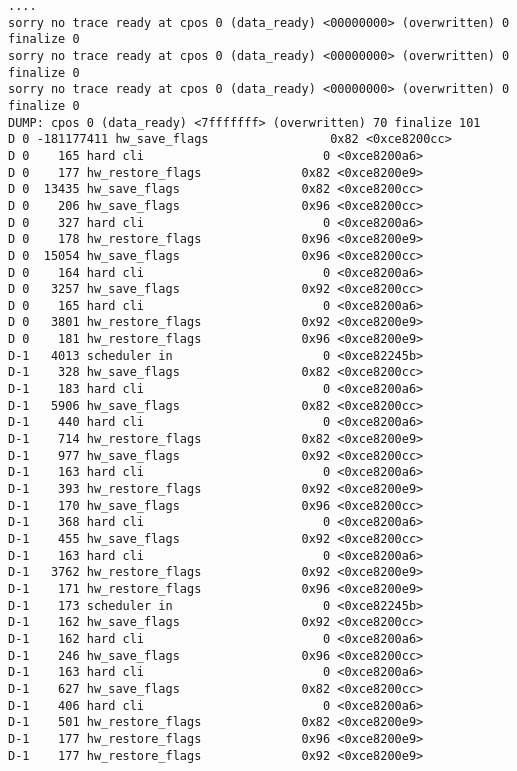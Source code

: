 \begin{verbatim}
....
sorry no trace ready at cpos 0 (data_ready) <00000000> (overwritten) 0 finalize 0
sorry no trace ready at cpos 0 (data_ready) <00000000> (overwritten) 0 finalize 0
sorry no trace ready at cpos 0 (data_ready) <00000000> (overwritten) 0 finalize 0
DUMP: cpos 0 (data_ready) <7fffffff> (overwritten) 70 finalize 101
D 0 -181177411 hw_save_flags                 0x82 <0xce8200cc>
D 0    165 hard cli                         0 <0xce8200a6>
D 0    177 hw_restore_flags              0x82 <0xce8200e9>
D 0  13435 hw_save_flags                 0x82 <0xce8200cc>
D 0    206 hw_save_flags                 0x96 <0xce8200cc>
D 0    327 hard cli                         0 <0xce8200a6>
D 0    178 hw_restore_flags              0x96 <0xce8200e9>
D 0  15054 hw_save_flags                 0x96 <0xce8200cc>
D 0    164 hard cli                         0 <0xce8200a6>
D 0   3257 hw_save_flags                 0x92 <0xce8200cc>
D 0    165 hard cli                         0 <0xce8200a6>
D 0   3801 hw_restore_flags              0x92 <0xce8200e9>
D 0    181 hw_restore_flags              0x96 <0xce8200e9>
D-1   4013 scheduler in                     0 <0xce82245b>
D-1    328 hw_save_flags                 0x82 <0xce8200cc>
D-1    183 hard cli                         0 <0xce8200a6>
D-1   5906 hw_save_flags                 0x82 <0xce8200cc>
D-1    440 hard cli                         0 <0xce8200a6>
D-1    714 hw_restore_flags              0x82 <0xce8200e9>
D-1    977 hw_save_flags                 0x92 <0xce8200cc>
D-1    163 hard cli                         0 <0xce8200a6>
D-1    393 hw_restore_flags              0x92 <0xce8200e9>
D-1    170 hw_save_flags                 0x96 <0xce8200cc>
D-1    368 hard cli                         0 <0xce8200a6>
D-1    455 hw_save_flags                 0x92 <0xce8200cc>
D-1    163 hard cli                         0 <0xce8200a6>
D-1   3762 hw_restore_flags              0x92 <0xce8200e9>
D-1    171 hw_restore_flags              0x96 <0xce8200e9>
D-1    173 scheduler in                     0 <0xce82245b>
D-1    162 hw_save_flags                 0x92 <0xce8200cc>
D-1    162 hard cli                         0 <0xce8200a6>
D-1    246 hw_save_flags                 0x96 <0xce8200cc>
D-1    163 hard cli                         0 <0xce8200a6>
D-1    627 hw_save_flags                 0x82 <0xce8200cc>
D-1    406 hard cli                         0 <0xce8200a6>
D-1    501 hw_restore_flags              0x82 <0xce8200e9>
D-1    177 hw_restore_flags              0x96 <0xce8200e9>
D-1    177 hw_restore_flags              0x92 <0xce8200e9>

\end{verbatim}
